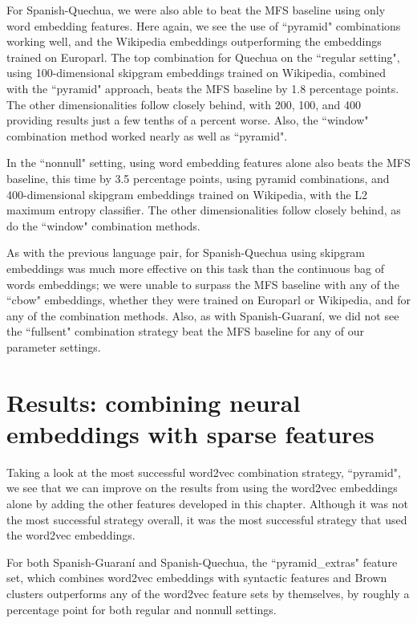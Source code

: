 For Spanish-Quechua, we were also able to beat the MFS baseline using only word
embedding features. Here again, we see the use of ``pyramid" combinations
working well, and the Wikipedia embeddings outperforming the embeddings trained
on Europarl. The top combination for Quechua on the ``regular setting", using
100-dimensional skipgram embeddings trained on Wikipedia, combined with the
``pyramid" approach, beats the MFS baseline by 1.8 percentage points. The other
dimensionalities follow closely behind, with 200, 100, and 400 providing
results just a few tenths of a percent worse. Also, the ``window" combination
method worked nearly as well as ``pyramid".

In the ``nonnull" setting, using word embedding features alone also beats the
MFS baseline, this time by 3.5 percentage points, using pyramid combinations,
and 400-dimensional skipgram embeddings trained on Wikipedia, with the L2
maximum entropy classifier. The other dimensionalities follow closely behind,
as do the ``window" combination methods.

As with the previous language pair, for Spanish-Quechua using skipgram
embeddings was much more effective on this task than the continuous bag of
words embeddings; we were unable to surpass the MFS baseline with any of the
``cbow" embeddings, whether they were trained on Europarl or Wikipedia, and for
any of the combination methods. Also, as with Spanish-Guaraní, we did not see
the ``fullsent" combination strategy beat the MFS baseline for any of our
parameter settings.


\section{Results: combining neural embeddings with sparse features}

Taking a look at the most successful word2vec combination strategy, ``pyramid",
we see that we can improve on the results from using the word2vec embeddings
alone by adding the other features developed in this chapter. Although it was
not the most successful strategy overall, it was the most successful strategy
that used the word2vec embeddings.

For both Spanish-Guaraní and Spanish-Quechua, the ``pyramid\_extras" feature
set, which combines word2vec embeddings with syntactic features and Brown
clusters outperforms any of the word2vec feature sets by themselves, by roughly
a percentage point for both regular and nonnull settings. 
